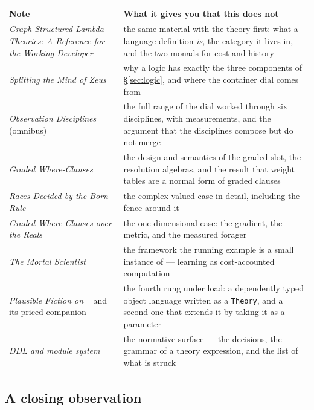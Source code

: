 \begin{center}
\small
\begin{tabular}{@{}L{0.40\textwidth}L{0.54\textwidth}@{}}
\toprule
\textbf{Note} & \textbf{What it gives you that this does not} \\
\midrule
\emph{Graph-Structured Lambda Theories: A Reference for the Working
Developer}~\cite{GSLTintro} &
the same material with the theory first: what a language definition
\emph{is}, the category it lives in, and the two monads for cost and history \\[3pt]
\emph{Splitting the Mind of Zeus}~\cite{Zeus} &
why a logic has exactly the three components of \S\ref{sec:logic}, and where the
container dial comes from \\[3pt]
\emph{Observation Disciplines} (omnibus)~\cite{ObsDisc} &
the full range of the dial worked through six disciplines, with measurements,
and the argument that the disciplines compose but do not merge \\[3pt]
\emph{Graded Where-Clauses}~\cite{GradedWhere} &
the design and semantics of the graded slot, the resolution algebras, and the
result that weight tables are a normal form of graded clauses \\[3pt]
\emph{Races Decided by the Born Rule}~\cite{GWQuantum} &
the complex-valued case in detail, including the fence around it \\[3pt]
\emph{Graded Where-Clauses over the Reals}~\cite{GWPLN} &
the one-dimensional case: the gradient, the metric, and the measured forager \\[3pt]
\emph{The Mortal Scientist}~\cite{ScientistNote} &
the framework the running example is a small instance of --- learning as
cost-accounted computation \\[3pt]
\emph{Plausible Fiction on \flang{}}~\cite{PF} and its priced
companion~\cite{PricedPF} &
the fourth rung under load: a dependently typed object language written as a
\texttt{Theory}, and a second one that extends it by taking it as a parameter
\\[3pt]
\emph{\flang{} DDL and module system}~\cite{DDLPlan} &
the normative surface --- the decisions, the grammar of a theory expression,
and the list of what is struck \\
\bottomrule
\end{tabular}
\end{center}

\subsection{A closing observation}

